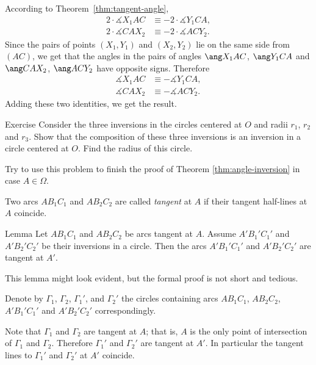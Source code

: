 {According to Theorem~\ref{thm:tangent-angle},
\begin{align*}
2\cdot \measuredangle X_1AC
&\equiv -2\cdot \measuredangle Y_1CA,
\\
2\cdot \measuredangle CAX_2
&\equiv -2\cdot \measuredangle ACY_2.
\end{align*}
Since the pairs of points $(X_1, Y_1)$ and $(X_2, Y_2)$
lie on the same side from $(AC)$,
we get that the  angles in the pairs of angles 
$\ang X_1AC$, $\ang Y_1CA$ 
and $\ang CAX_2$, $\ang ACY_2$
have opposite signs.
Therefore 
\begin{align*}
\measuredangle X_1AC
&\equiv - \measuredangle Y_1CA,
\\
 \measuredangle CAX_2
&\equiv - \measuredangle ACY_2.
\end{align*}
Adding these two identities, we get the result.
\qeds








\begin{thm}{Exercise}\label{ex:3-inversions}
Consider the three inversions
in the circles centered at $O$ and radii $r_1$, $r_2$ and $r_3$.
Show that the composition of these three inversions is an inversion in a circle centered at $O$.
Find the radius of this circle.

Try to use this problem to finish the proof of Theorem \ref{thm:angle-inversion} in case $A\in\Omega$.
\end{thm}







Two arcs $AB_1C_1$ and $AB_2C_2$ are called \emph{tangent} at $A$ if their tangent half-lines at $A$ coincide.

\begin{thm}{Lemma}\label{lem:tangent-to-tangent}
Let $AB_1C_1$ and $AB_2C_2$ be arcs tangent at $A$.
Assume $A'B_1'C_1'$ and $A'B_2'C_2'$ be their inversions in a circle.
Then the arcs $A'B_1'C_1'$ and $A'B_2'C_2'$ are tangent at $A'$.
\end{thm}

This lemma might look evident, 
but the formal proof is not short and tedious.

Denote by $\Gamma_1$, $\Gamma_2$, $\Gamma_1'$, and $\Gamma_2'$ the circles containing arcs $AB_1C_1$, $AB_2C_2$, $A'B_1'C_1'$ and $A'B_2'C_2'$ correspondingly.

Note that $\Gamma_1$ and $\Gamma_2$ are tangent at $A$; 
that is, $A$ is the only point of intersection of 
$\Gamma_1$ and $\Gamma_2$.
Therefore $\Gamma_1'$ and $\Gamma_2'$ are tangent at $A'$.
In particular the tangent lines to $\Gamma_1'$ and $\Gamma_2'$ at $A'$ coincide.

}

